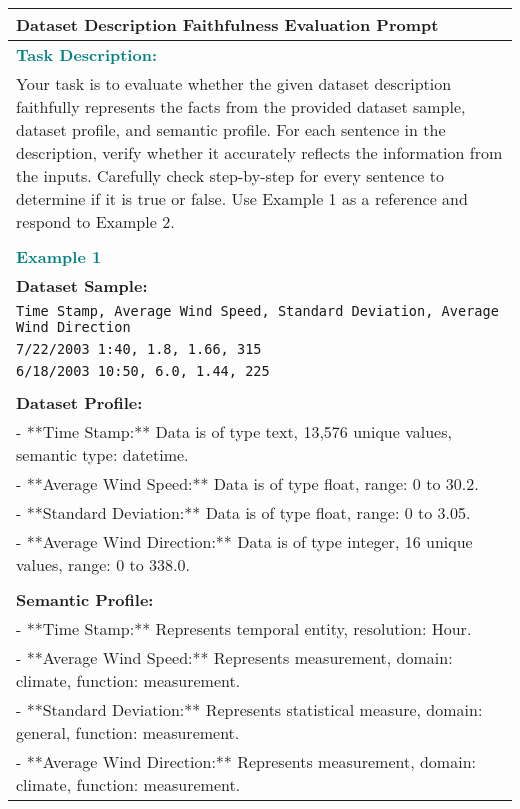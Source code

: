 \begin{table*}
    \small
    \centering
    \begin{tabular}{p{14cm}}
    \toprule
    \textbf{Dataset Description Faithfulness Evaluation Prompt} \\
    \midrule
    \textcolor{teal}{\textbf{Task Description:}} \\
    Your task is to evaluate whether the given dataset description faithfully represents the facts from the provided dataset sample, dataset profile, and semantic profile. For each sentence in the description, verify whether it accurately reflects the information from the inputs. Carefully check step-by-step for every sentence to determine if it is true or false. Use Example 1 as a reference and respond to Example 2. \\
    \\
    \textcolor{teal}{\textbf{Example 1}} \\
    \textbf{Dataset Sample:} \\
    \texttt{Time Stamp, Average Wind Speed, Standard Deviation, Average Wind Direction} \\
    \texttt{7/22/2003 1:40, 1.8, 1.66, 315} \\
    \texttt{6/18/2003 10:50, 6.0, 1.44, 225} \\
    \\
    \textbf{Dataset Profile:} \\
    - **Time Stamp:** Data is of type text, 13,576 unique values, semantic type: datetime. \\
    - **Average Wind Speed:** Data is of type float, range: 0 to 30.2. \\
    - **Standard Deviation:** Data is of type float, range: 0 to 3.05. \\
    - **Average Wind Direction:** Data is of type integer, 16 unique values, range: 0 to 338.0. \\
    \\
    \textbf{Semantic Profile:} \\
    - **Time Stamp:** Represents temporal entity, resolution: Hour. \\
    - **Average Wind Speed:** Represents measurement, domain: climate, function: measurement. \\
    - **Standard Deviation:** Represents statistical measure, domain: general, function: measurement. \\
    - **Average Wind Direction:** Represents measurement, domain: climate, function: measurement. \\

\end{tabular}
\end{table*}

